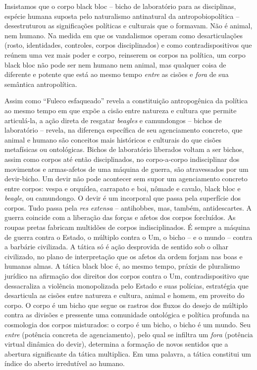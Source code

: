 Insistamos que o corpo black bloc -- bicho de laboratório para as
disciplinas, espécie humana suposta pelo naturalismo antinatural da
antropobiopolítica -- desestruturou as significações políticas e
culturais que o formavam. Não é animal, nem humano. Na medida em que os
vandalismos operam como desarticulações (rosto, identidades, controles,
corpos disciplinados) e como contradispositivos que reúnem uma vez mais
poder e corpo, reinserem os corpos na política, um corpo black bloc não
pode ser nem humano nem animal, mas qualquer coisa de diferente e
potente que está ao mesmo tempo \emph{entre }as cisões\emph{ }e
\emph{fora }de sua semântica antropolítica.

Assim como ``Fuleco esfaqueado'' revela a constituição antropogênica da
política ao mesmo tempo em que expõe a cisão entre natureza e cultura
que permite articulá-la, a ação direta de resgatar \emph{beagles }e
camundongos -- bichos de laboratório -- revela, na diferença específica
de seu agenciamento concreto, que animal e humano são conceitos mais
históricos e culturais do que cisões metafísicas ou ontológicas. Bichos
de laboratório liberados voltam a ser bichos, assim como corpos até
então disciplinados, no corpo-a-corpo indisciplinar dos movimentos e
armas-afetos de uma máquina de guerra, são atravessados por um
devir-bicho. Um devir não pode acontecer sem supor um agenciamento
concreto entre corpos: vespa e orquídea, carrapato e boi, nômade e
cavalo, black bloc e \emph{beagle}, ou camundongo. O devir é um
incorporal que passa pela superfície dos corpos. Tudo passa pela
\emph{res extensa} -- antihobbes, mas, também, antidescartes. A guerra
coincide com a liberação das forças e afetos dos corpos forcluídos. As
roupas pretas fabricam multidões de corpos indisciplinados. É sempre a
máquina de guerra contra o Estado, o múltiplo contra o Um, o bicho -- e
o mundo -- contra a barbárie civilizada. A tática só é ação desprovida
de sentido sob o olhar civilizado, no plano de interpretação que os
afetos da ordem forjam nas boas e humanas almas. A tática black bloc é,
ao mesmo tempo, práxis de pluralismo jurídico na afirmação dos direitos
dos corpos contra o Um, contradispositivo que dessacraliza a violência
monopolizada pelo Estado e suas polícias, estratégia que desarticula as
cisões entre natureza e cultura, animal e homem, em proveito do corpo. O
corpo é um bicho que segue os rastros dos fluxos do desejo de múltiplo
contra as divisões e pressente uma comunidade ontológica e política
profunda na cosmologia dos corpos misturados: o corpo é um bicho, o
bicho é um mundo. Seu \emph{entre }(potência concreta de
agenciamento)\emph{,} pelo qual se infiltra um \emph{fora }(potência
virtual dinâmica do devir), determina a formação de novos sentidos que a
abertura significante da tática multiplica. Em uma palavra, a tática
constitui um índice do aberto irredutível ao humano.

